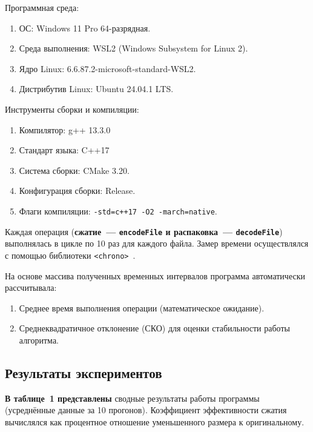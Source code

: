 \documentclass[a4paper]{article}
\begin{document}
Программная среда:

\begin{enumerate}
    \item ОС: Windows 11 Pro 64-разрядная.
    \item Среда выполнения: WSL2 (Windows Subsystem for Linux 2).
    \item Ядро Linux: 6.6.87.2-microsoft-standard-WSL2.
    \item Дистрибутив Linux: Ubuntu 24.04.1 LTS.
\end{enumerate}

Инструменты сборки и компиляции:

\begin{enumerate}
    \item Компилятор: g++ 13.3.0
    \item Стандарт языка: C++17
    \item Система сборки: CMake 3.20.
    \item Конфигурация сборки: Release.
    \item Флаги компиляции: \texttt{-std=c++17 -O2 -march=native}.
\end{enumerate}

Каждая операция (\textbf{сжатие~--- \texttt{encodeFile} и распаковка~--- \texttt{decodeFile}})
выполнялась в цикле по 10 раз для каждого файла. Замер времени осуществлялся с помощью
библиотеки \texttt{<chrono>}~\cite{chrono}.

На основе массива полученных временных интервалов программа автоматически рассчитывала:

\begin{enumerate}
    \item Среднее время выполнения операции (математическое ожидание).
    \item Среднеквадратичное отклонение (СКО) для оценки стабильности работы алгоритма.
\end{enumerate}

\subsection{Результаты экспериментов}

\textbf{В таблице~1 представлены} сводные результаты работы программы (усреднённые данные за 10
прогонов). Коэффициент эффективности сжатия вычислялся как процентное отношение
уменьшенного размера к оригинальному.
\end{document}
